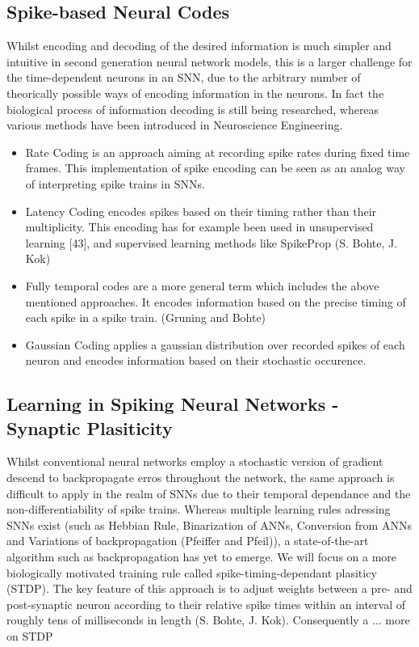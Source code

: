 \documentclass[letterpaper, 10 pt, conference]{ieeeconf}  %
\begin{document}
\subsection{Spike-based Neural Codes}

Whilst encoding and decoding of the desired information is much simpler and intuitive in second generation neural network models,
this is a larger challenge for the time-dependent neurons in an SNN, due to the arbitrary 
number of theorically possible ways of encoding information in the neurons. In fact the biological process of information decoding is 
still being researched, whereas various methods have been introduced in Neuroscience Engineering.

\begin{itemize}

        \item Rate Coding is an approach aiming at recording spike rates during fixed time frames. This implementation of spike encoding can be seen as an analog way of interpreting spike trains in SNNs.
        \item Latency Coding encodes spikes based on their timing rather than their multiplicity. This encoding has for example been used in unsupervised learning [43], and
        supervised learning methods like SpikeProp (S. Bohte, J. Kok)
        \item Fully temporal codes are a more general term which includes the above mentioned approaches. It encodes information based on the precise
        timing of each spike in a spike train. (Gruning and Bohte)
        \item Gaussian Coding applies a gaussian distribution over recorded spikes of each neuron and encodes information based on their stochastic occurence.
\end{itemize}        

\subsection{Learning in Spiking Neural Networks - Synaptic Plasiticity}

Whilst conventional neural networks employ a stochastic version of gradient descend to backpropagate erros throughout the network, the same approach
is difficult to apply in the realm of SNNs due to their temporal dependance and the non-differentiability of spike trains. Whereas multiple learning
rules adressing SNNs exist (such as Hebbian Rule, Binarization of ANNs, Conversion from ANNs and Variations of backpropagation (Pfeiffer and Pfeil)), 
a state-of-the-art algorithm such as backpropagation has yet to emerge. We will focus on a more 
biologically motivated training rule called spike-timing-dependant plasiticy (STDP). The key feature of this approach is 
to adjust weights between a pre- and post-synaptic neuron according to their relative spike times within an interval of roughly tens of 
milliseconds in length (S. Bohte, J. Kok). Consequently a 
... more on STDP 
\end{document}
